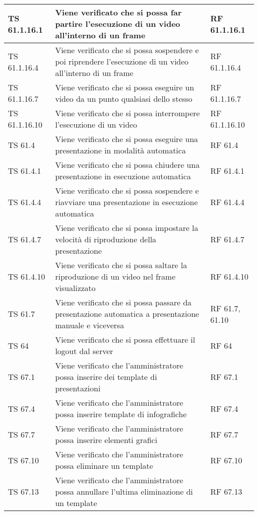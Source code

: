 {{\begin{longtable} [c]{| p{3cm} | p{6cm} |p{3cm}|}
			\hline
			TS 61.1.16.1 & Viene verificato che si possa far partire l'esecuzione di un video all'interno di un frame & RF 61.1.16.1\\
			\hline
			TS 61.1.16.4 & Viene verificato che si possa sospendere e poi riprendere l'esecuzione di un video all'interno di un frame & RF 61.1.16.4\\
			\hline
			TS 61.1.16.7 & Viene verificato che si possa eseguire un video da un punto qualsiasi dello stesso & RF 61.1.16.7\\
			\hline
			TS 61.1.16.10 & Viene verificato che si possa interrompere l'esecuzione di un video & RF 61.1.16.10\\
			\hline
			TS 61.4 & Viene verificato che si possa eseguire una presentazione in modalità automatica & RF 61.4\\
			\hline
			TS 61.4.1 & Viene verificato che si possa chiudere una presentazione in esecuzione automatica & RF 61.4.1\\
			\hline
			TS 61.4.4 & Viene verificato che si possa sospendere e riavviare una presentazione in esecuzione automatica & RF 61.4.4\\
			\hline
			TS 61.4.7 & Viene verificato che si possa impostare la velocità di riproduzione della presentazione & RF 61.4.7\\
			\hline
			TS 61.4.10 & Viene verificato che si possa saltare la riproduzione di un video nel frame visualizzato & RF 61.4.10\\
			\hline
			TS 61.7 & Viene verificato che si possa passare da presentazione automatica a presentazione manuale e viceversa & RF 61.7, 61.10\\
			\hline
			TS 64 & Viene verificato che si possa effettuare il logout dal server & RF 64\\
			\hline
			TS 67.1 & Viene verificato che l'amministratore possa inserire dei template di presentazioni & RF 67.1\\
			\hline
			TS 67.4 & Viene verificato che l'amministratore possa inserire template di infografiche & RF 67.4\\
			\hline
			TS 67.7 & Viene verificato che l'amministratore possa inserire elementi grafici & RF 67.7\\
			\hline
			TS 67.10 & Viene verificato che l'amministratore possa eliminare un template & RF 67.10\\
			\hline
			TS 67.13 & Viene verificato che l'amministratore possa annullare l'ultima eliminazione di un template & RF 67.13\\

\end{longtable}}}
